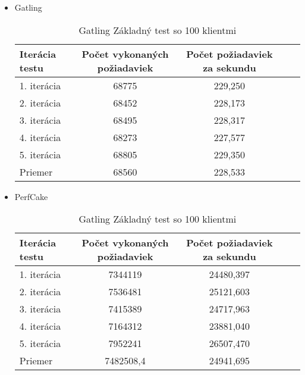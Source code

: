 \documentclass[12pt,oneside,final]{fithesis-utf8}
\begin{document}
\begin{itemize}
\item Gatling

\begin{table}[H]
\begin{center}
\begin{tabular}{ | l | c | c | c | c |}
		\hline
		 \textbf{Iterácia testu} & \textbf{Počet vykonaných požiadaviek} & \textbf{Počet požiadaviek za sekundu} \\ \hline
		 1. iterácia & 68775 & 229,250 \\ \hline
		 2. iterácia & 68452 & 228,173 \\ \hline
		 3. iterácia & 68495 & 228,317 \\ \hline
		 4. iterácia & 68273 & 227,577 \\ \hline
		 5. iterácia & 68805 & 229,350 \\ \hline
		 Priemer & 68560 & 228,533 \\ \hline
		 
\end{tabular}
\end{center}
\caption{Gatling Základný test so 100 klientmi}
\end{table}


\item PerfCake

\begin{table}[H]
\begin{center}
\begin{tabular}{ | l | c | c | c | c |}
		\hline
		 \textbf{Iterácia testu} & \textbf{Počet vykonaných požiadaviek} & \textbf{Počet požiadaviek za sekundu} \\ \hline
		 1. iterácia & 7344119 & 24480,397 \\ \hline
		 2. iterácia & 7536481 & 25121,603 \\ \hline
		 3. iterácia & 7415389 & 24717,963 \\ \hline
		 4. iterácia & 7164312 & 23881,040 \\ \hline
		 5. iterácia & 7952241 & 26507,470 \\ \hline
		 Priemer & 7482508,4 & 24941,695 \\ \hline
		 
\end{tabular}
\end{center}
\caption{Gatling Základný test so 100 klientmi}
\end{table}

\end{itemize}
\end{document}

